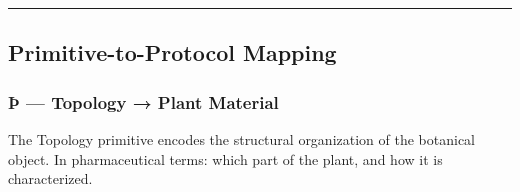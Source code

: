 \begin{center}\rule{0.5\linewidth}{0.5pt}\end{center}

\hypertarget{primitive-to-protocol-mapping}{%
\subsection{Primitive-to-Protocol
Mapping}\label{primitive-to-protocol-mapping}}

\hypertarget{uxfe-topology-plant-material}{%
\subsubsection{Þ --- Topology → Plant
Material}\label{uxfe-topology-plant-material}}

The Topology primitive encodes the structural organization of the
botanical object. In pharmaceutical terms: which part of the plant, and
how it is characterized.

